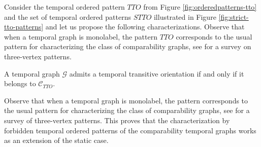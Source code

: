 \documentclass[runningheads]{llncs}
\begin{document}
Consider the temporal ordered pattern $TTO$ from Figure \ref{fig:orderedpatterns-tto} and the set of temporal ordered patterns $STTO$ illustrated in Figure \ref{fig:strict-tto-patterns} and let us propose the following characterizations. Observe that when a temporal graph is monolabel, the pattern $TTO$ corresponds to the usual pattern for characterizing the class of comparability graphs, see \cite{FeuilloleyH21} for a survey on three-vertex patterns.

\begin{theorem}\label{theo:tto-pattern-characterization}
    A temporal graph $\mathcal{G}$ admits a temporal transitive orientation if and only if it
belongs to $\mathcal{C}_{TTO}$.
\end{theorem}

Observe that when a temporal graph is monolabel, the pattern corresponds to the usual pattern for characterizing the class of comparability graphs, see \cite{FeuilloleyH21} for a survey of three-vertex patterns. This proves that the characterization by forbidden temporal ordered patterns of the comparability temporal graphs works as an extension of the static case.
\end{document}
